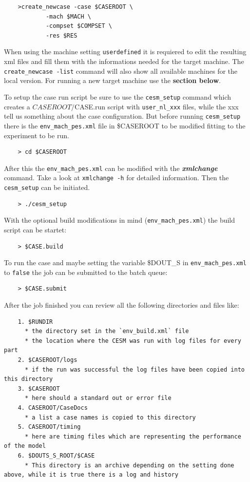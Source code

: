 \documentclass[]{article}
\begin{document}
\begin{verbatim}
    >create_newcase -case $CASEROOT \
            -mach $MACH \
            -compset $COMPSET \
            -res $RES
\end{verbatim}

When using the machine setting \texttt{userdefined} it is requiered to
edit the resulting xml files and fill them with the informations needed
for the target machine. The \texttt{create\_newcase\ -list} command will
also show all available machines for the local version. For running a
new target machine use the \textbf{section below}.

To setup the case run script be sure to use the \texttt{cesm\_setup}
command which creates a \(CASEROOT/\)CASE.run script with
\texttt{user\_nl\_xxx} files, while the xxx tell us something about the
case configuration. But before running \texttt{cesm\_setup} there is the
\texttt{env\_mach\_pes.xml} file in \$CASEROOT to be modified fitting to
the experiment to be run.

\begin{verbatim}
    > cd $CASEROOT
\end{verbatim}

After this the \texttt{env\_mach\_pes.xml} can be modified with the
\textbf{\emph{xmlchange}} command. Take a look at \texttt{xmlchange\ -h}
for detailed information. Then the \texttt{cesm\_setup} can be
initiated.

\begin{verbatim}
    > ./cesm_setup
\end{verbatim}

With the optional build modifications in mind
(\texttt{env\_mach\_pes.xml}) the build script can be startet:

\begin{verbatim}
    > $CASE.build
\end{verbatim}

To run the case and maybe setting the variable \$DOUT\_S in
\texttt{env\_mach\_pes.xml} to \texttt{false} the job can be submitted
to the batch queue:

\begin{verbatim}
    > $CASE.submit
\end{verbatim}

After the job finished you can review all the following directories and
files like:

\begin{verbatim}
    1. $RUNDIR
      * the directory set in the `env_build.xml` file
      * the location where the CESM was run with log files for every part
    2. $CASEROOT/logs
      * if the run was successful the log files have been copied into this directory
    3. $CASEROOT
      * here should a standard out or error file
    4. CASEROOT/CaseDocs
      * a list a case names is copied to this directory
    5. CASEROOT/timing
      * here are timing files which are representing the performance of the model
    6. $DOUTS_S_ROOT/$CASE
      * This directory is an archive depending on the setting done above, while it is true there is a log and history
\end{verbatim}
\end{document}
